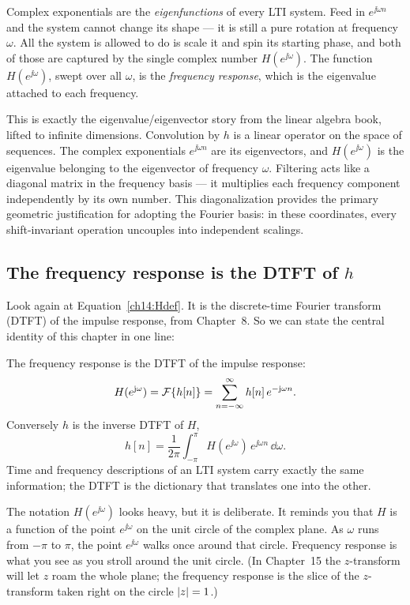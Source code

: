 \begin{happeningbox}
Complex exponentials are the \emph{eigenfunctions} of every LTI system. Feed in
$e^{\jj\omega n}$ and the system cannot change its shape --- it is still a pure
rotation at frequency $\omega$. All the system is allowed to do is scale it and
spin its starting phase, and both of those are captured by the single complex
number $H(e^{\jj\omega})$. The function $H(e^{\jj\omega})$, swept over all
$\omega$, is the \emph{frequency response}, which is the eigenvalue
attached to each frequency.
\end{happeningbox}

\begin{connectionbox}
This is exactly the eigenvalue/eigenvector story from the linear algebra book,
lifted to infinite dimensions. Convolution by $h$ is a linear operator on the
space of sequences. The complex exponentials $e^{\jj\omega n}$ are its
eigenvectors, and $H(e^{\jj\omega})$ is the eigenvalue belonging to the
eigenvector of frequency $\omega$. Filtering acts like a diagonal matrix in the frequency
basis --- it multiplies each frequency component independently by its own number. This
diagonalization provides the primary geometric justification for adopting the
Fourier basis: in these coordinates, every shift-invariant operation uncouples
into independent scalings.
\end{connectionbox}

\subsection{The frequency response is the DTFT of \texorpdfstring{$h$}{h}}

Look again at Equation~\eqref{ch14:Hdef}. It is the discrete-time Fourier
transform (DTFT) of the impulse response, from Chapter~8. So we can state the
central identity of this chapter in one line:

\begin{formalbox}
The frequency response is the DTFT of the impulse response:
\[
  H(e^{\mathrm{j}\omega}) = \mathcal{F}\{h[n]\} = \sum_{n=-\infty}^{\infty} h[n]\, e^{-\mathrm{j}\omega n}.
\]
Conversely $h$ is the inverse DTFT of $H$,
\[
  h[n] = \frac{1}{2\pi}\int_{-\pi}^{\pi} H(e^{\jj\omega})\, e^{\jj\omega n}\,\dd\omega .
\]
Time and frequency descriptions of an LTI system carry exactly the same
information; the DTFT is the dictionary that translates one into the other.
\end{formalbox}

The notation $H(e^{\jj\omega})$ looks heavy, but it is deliberate. It reminds
you that $H$ is a function of the point $e^{\jj\omega}$ on the unit
circle of the complex plane. As $\omega$ runs from $-\pi$ to $\pi$, the point
$e^{\jj\omega}$ walks once around that circle. Frequency response is what you
see as you stroll around the unit circle. (In Chapter~15 the $z$-transform will
let $z$ roam the whole plane; the frequency response is the slice of the
$z$-transform taken right on the circle $\lvert z\rvert=1$.)

